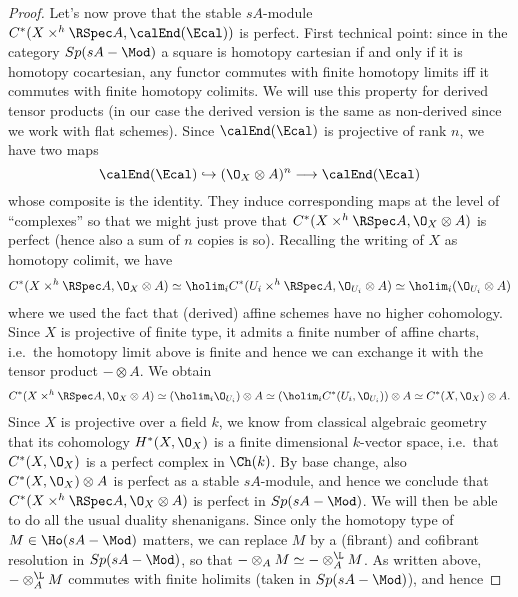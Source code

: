 \begin{proof}
            Let's now prove that the stable $sA$-module $C^*(X \times^h \RSpec A, \calEnd(\Ecal))$ is perfect. First technical point: since in the category $Sp(sA-\Mod)$ a square is homotopy cartesian if and only if it is homotopy cocartesian, any functor commutes with finite homotopy limits iff it commutes with finite homotopy colimits. %
            We will use this property for derived tensor products (in our case the derived version is the same as non-derived since we work with flat schemes). Since $\calEnd(\Ecal)$ is projective of rank $n$, we have two maps \[\calEnd(\Ecal) \hookrightarrow (\O_X \otimes A)^n \longrightarrow \calEnd(\Ecal) \] whose composite is the identity. They induce corresponding maps at the level of ``complexes'' so that we might just prove that $C^*(X \times^h \RSpec A, \O_X \otimes A)$ is perfect (hence also a sum of $n$ copies is so). Recalling the writing of $X$ as homotopy colimit, we have 
            \begin{gather*}
                C^*(X \times^h \RSpec A, \O_X \otimes A) \simeq \holim_i C^*(U_i \times^h \RSpec A, \O_{U_i} \otimes A) \simeq \holim_i (\O_{U_i} \otimes A)
            \end{gather*}
            where we used the fact that (derived) affine schemes have no higher cohomology. Since $X$ is projective of finite type, it admits a finite number of affine charts, i.e.\ the homotopy limit above is finite and hence we can exchange it with the tensor product $- \otimes A$. We obtain 
            \begin{gather*}
                C^*(X \times^h \RSpec A, \O_X \otimes A) \simeq (\holim_i \O_{U_i}) \otimes A \simeq (\holim_i C^*(U_i, \O_{U_i})) \otimes A \simeq C^*(X, \O_X) \otimes A.
            \end{gather*}
            Since $X$ is projective over a field $k$, we know from classical algebraic geometry that its cohomology $H^*(X, \O_X)$ is a finite dimensional $k$-vector space, i.e.\ that $C^*(X, \O_X)$ is a perfect complex in $\Ch(k)$. By base change, also $C^*(X, \O_X) \otimes A$ is perfect as a stable $sA$-module, and hence we conclude that $C^*(X \times^h \RSpec A, \O_X \otimes A)$ is perfect in $Sp(sA-\Mod)$. We will then be able to do all the usual duality shenanigans.
            Since only the homotopy type of $M \in \Ho(sA-\Mod)$ matters, we can replace $M$ by a (fibrant) and cofibrant resolution in $Sp(sA-\Mod)$, so that $- \otimes_A M \simeq - \otimes_A^{\L} M$. As written above, $- \otimes_A^{\L} M$ commutes with finite holimits (taken in $Sp(sA-\Mod)$), and hence

\end{proof}
